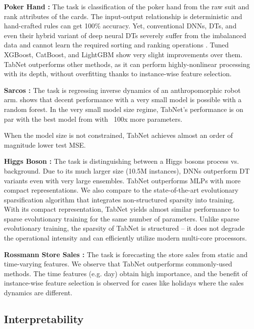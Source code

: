 {\bf Poker Hand \citep{UCI}:} The task is classification of the poker hand from the raw suit and rank attributes of the cards. The input-output relationship is deterministic and hand-crafted rules can get 100\% accuracy. Yet, conventional DNNs, DTs, and even their hybrid variant of deep neural DTs \cite{dndt} severely suffer from the imbalanced data and cannot learn the required sorting and ranking operations \cite{dndt}. Tuned XGBoost, CatBoost, and LightGBM show very slight improvements over them. TabNet outperforms other methods, as it can perform highly-nonlinear processing with its depth, without overfitting thanks to instance-wise feature selection.

{\bf Sarcos \citep{sarcos_dataset}:} The task is regressing inverse dynamics of an anthropomorphic robot arm. \citep{ant} shows that decent performance with a very small model is possible with a random forest. In the very small model size regime, TabNet's performance is on par with the best model from \citep{ant} with ~100x more parameters. 

When the model size is not constrained, TabNet achieves almost an order of magnitude lower test MSE. 

{\bf Higgs Boson \citep{UCI}:} The task is distinguishing between a Higgs bosons process vs. background. Due to its much larger size (10.5M instances), DNNs outperform DT variants even with very large ensembles. TabNet outperforms MLPs with more compact representations. We also compare to the state-of-the-art evolutionary sparsification algorithm \citep{sparse_mlp} that integrates non-structured sparsity into training. With its compact representation, TabNet yields almost similar performance to sparse evolutionary training for the same number of parameters. Unlike sparse evolutionary training, the sparsity of TabNet is structured -- it does not degrade the operational intensity \citep{structured_sparsity} and can efficiently utilize modern multi-core processors.

{\bf Rossmann Store Sales \citep{kaggle_rossmann}:} The task is forecasting the store sales from static and time-varying features. We observe that TabNet outperforms commonly-used methods. The time features (e.g. day) obtain high importance, and the benefit of instance-wise feature selection is observed for cases like holidays where the sales dynamics are different.

\subsection{Interpretability}
\label{interpretability_section}

